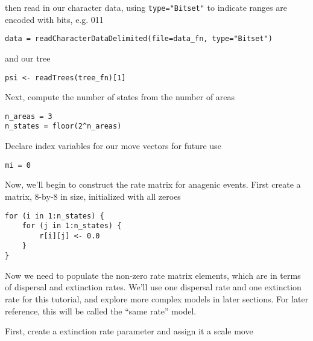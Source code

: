 then read in our character data, using {\tt type="Bitset"} to indicate ranges are encoded with bits, e.g. 011

\begin{snugshade}
\begin{lstlisting}
data = readCharacterDataDelimited(file=data_fn, type="Bitset")
\end{lstlisting}
\end{snugshade}

and our tree

\begin{snugshade}
\begin{lstlisting}
psi <- readTrees(tree_fn)[1]
\end{lstlisting}
\end{snugshade}

Next, compute the number of states from the number of areas

\begin{snugshade}
\begin{lstlisting}
n_areas = 3
n_states = floor(2^n_areas)
\end{lstlisting}
\end{snugshade}

Declare index variables for our move vectors for future use

\begin{snugshade}
\begin{lstlisting}
mi = 0
\end{lstlisting}
\end{snugshade}

Now, we'll begin to construct the rate matrix for anagenic events. First create a matrix, 8-by-8 in size, initialized with all zeroes

\begin{snugshade}
\begin{lstlisting}
for (i in 1:n_states) {
    for (j in 1:n_states) {
        r[i][j] <- 0.0
    }
}
\end{lstlisting}
\end{snugshade}

Now we need to populate the non-zero rate matrix elements, which are in terms of dispersal and extinction rates.
We'll use one dispersal rate and one extinction rate for this tutorial, and explore more complex models in later sections.
For later reference, this will be called the ``same rate'' model.

First, create a extinction rate parameter and assign it a scale move

